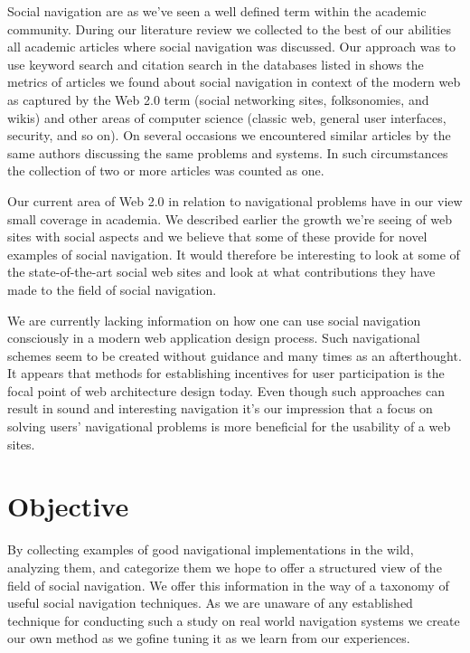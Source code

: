 Social navigation are as we've seen a well defined term within the academic
community.
During our literature review we collected to the best of our abilities all
academic articles where social navigation was discussed. Our approach was to
use keyword search and citation search in the databases listed in
shows the metrics of articles
we found about social navigation in context of the modern web as captured by
the Web 2.0 term (social networking sites, folksonomies, and wikis) and other
areas of computer science (classic web, general user interfaces, security, and
so on).
On several occasions we encountered similar articles by the same authors
discussing the same problems and systems. In such circumstances the collection
of two or more articles was counted as one.

Our current area of Web 2.0 in relation to navigational problems have in our
view small coverage in academia.
We described earlier the growth we're seeing of web sites with social
aspects and we believe that some of these provide for novel examples of social
navigation. It would therefore be interesting to look at some of the
state-of-the-art social web sites and look at what contributions they have
made to the field of social navigation.

We are currently lacking information on how one can use social navigation
consciously in a modern web application design process. Such navigational
schemes seem to be created without guidance and many times as an afterthought.
It appears that methods for establishing incentives for user participation
is the focal point of web architecture design today. Even though such
approaches can result in sound and interesting navigation it's our impression
that a focus on solving users' navigational problems is more beneficial for
the usability of a web sites.

\section{Objective}

By collecting examples of good navigational implementations in the wild,
analyzing them, and categorize them we hope to offer a structured view of the
field of social navigation. We offer this information in the way of a taxonomy
of useful social navigation techniques.
As we are unaware of any established technique for
conducting such a study on real world navigation systems we create our own
method as we go\dash{}fine tuning it as we learn from our experiences.

